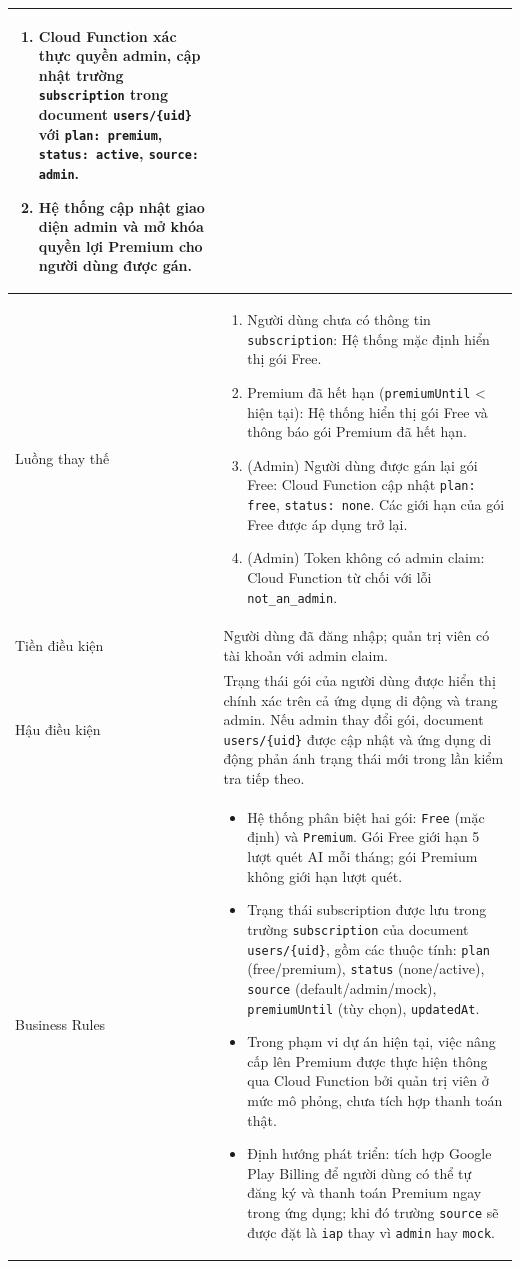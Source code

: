 \begin{longtable}{|p{4cm}|p{11cm}|}
\begin{enumerate}[nosep]
            \item Cloud Function xác thực quyền admin, cập nhật trường \texttt{subscription} trong document \texttt{users/\{uid\}} với \texttt{plan: premium}, \texttt{status: active}, \texttt{source: admin}.
            \item Hệ thống cập nhật giao diện admin và mở khóa quyền lợi Premium cho người dùng được gán.
        \end{enumerate} \\
    \hline
    Luồng thay thế &
        \begin{enumerate}[nosep]
            \item[2a.] Người dùng chưa có thông tin \texttt{subscription}: Hệ thống mặc định hiển thị gói Free.
            \item[3a.] Premium đã hết hạn (\texttt{premiumUntil} < hiện tại): Hệ thống hiển thị gói Free và thông báo gói Premium đã hết hạn.
            \item[4a.] (Admin) Người dùng được gán lại gói Free: Cloud Function cập nhật \texttt{plan: free}, \texttt{status: none}. Các giới hạn của gói Free được áp dụng trở lại.
            \item[5a.] (Admin) Token không có admin claim: Cloud Function từ chối với lỗi \texttt{not\_an\_admin}.
        \end{enumerate} \\
    \hline
    Tiền điều kiện & Người dùng đã đăng nhập; quản trị viên có tài khoản với admin claim. \\
    \hline
    Hậu điều kiện & Trạng thái gói của người dùng được hiển thị chính xác trên cả ứng dụng di động và trang admin. Nếu admin thay đổi gói, document \texttt{users/\{uid\}} được cập nhật và ứng dụng di động phản ánh trạng thái mới trong lần kiểm tra tiếp theo. \\
    \hline
    Business Rules &
        \begin{itemize}[nosep]
            \item Hệ thống phân biệt hai gói: \texttt{Free} (mặc định) và \texttt{Premium}. Gói Free giới hạn 5 lượt quét AI mỗi tháng; gói Premium không giới hạn lượt quét.
            \item Trạng thái subscription được lưu trong trường \texttt{subscription} của document \texttt{users/\{uid\}}, gồm các thuộc tính: \texttt{plan} (free/premium), \texttt{status} (none/active), \texttt{source} (default/admin/mock), \texttt{premiumUntil} (tùy chọn), \texttt{updatedAt}.
            \item Trong phạm vi dự án hiện tại, việc nâng cấp lên Premium được thực hiện thông qua Cloud Function bởi quản trị viên ở mức mô phỏng, chưa tích hợp thanh toán thật.
            \item Định hướng phát triển: tích hợp Google Play Billing để người dùng có thể tự đăng ký và thanh toán Premium ngay trong ứng dụng; khi đó trường \texttt{source} sẽ được đặt là \texttt{iap} thay vì \texttt{admin} hay \texttt{mock}.
        \end{itemize} \\
    \hline
\end{longtable}


